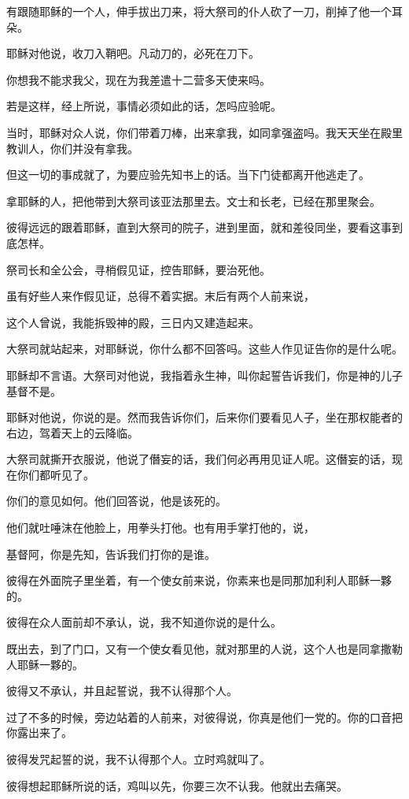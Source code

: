 \documentclass[12pt,oneside]{book}
\begin{document}
有跟随耶稣的一个人，伸手拔出刀来，将大祭司的仆人砍了一刀，削掉了他一个耳朵。

耶稣对他说，收刀入鞘吧。凡动刀的，必死在刀下。

你想我不能求我父，现在为我差遣十二营多天使来吗。

若是这样，经上所说，事情必须如此的话，怎吗应验呢。

当时，耶稣对众人说，你们带着刀棒，出来拿我，如同拿强盗吗。我天天坐在殿里教训人，你们并没有拿我。

但这一切的事成就了，为要应验先知书上的话。当下门徒都离开他逃走了。

拿耶稣的人，把他带到大祭司该亚法那里去。文士和长老，已经在那里聚会。

彼得远远的跟着耶稣，直到大祭司的院子，进到里面，就和差役同坐，要看这事到底怎样。

祭司长和全公会，寻梢假见证，控告耶稣，要治死他。

虽有好些人来作假见证，总得不着实据。末后有两个人前来说，

这个人曾说，我能拆毁神的殿，三日内又建造起来。

大祭司就站起来，对耶稣说，你什么都不回答吗。这些人作见证告你的是什么呢。

耶稣却不言语。大祭司对他说，我指着永生神，叫你起誓告诉我们，你是神的儿子基督不是。

耶稣对他说，你说的是。然而我告诉你们，后来你们要看见人子，坐在那权能者的右边，驾着天上的云降临。

大祭司就撕开衣服说，他说了僭妄的话，我们何必再用见证人呢。这僭妄的话，现在你们都听见了。

你们的意见如何。他们回答说，他是该死的。

他们就吐唾沫在他脸上，用拳头打他。也有用手掌打他的，说，

基督阿，你是先知，告诉我们打你的是谁。

彼得在外面院子里坐着，有一个使女前来说，你素来也是同那加利利人耶稣一夥的。

彼得在众人面前却不承认，说，我不知道你说的是什么。

既出去，到了门口，又有一个使女看见他，就对那里的人说，这个人也是同拿撒勒人耶稣一夥的。

彼得又不承认，并且起誓说，我不认得那个人。

过了不多的时候，旁边站着的人前来，对彼得说，你真是他们一党的。你的口音把你露出来了。

彼得发咒起誓的说，我不认得那个人。立时鸡就叫了。

彼得想起耶稣所说的话，鸡叫以先，你要三次不认我。他就出去痛哭。
\end{document}
